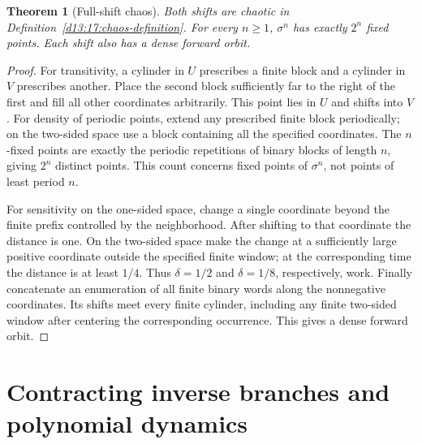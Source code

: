 \documentclass[11pt,oneside]{book}
\newtheorem{theorem}{Theorem}[chapter]
\theoremstyle{definition}
\theoremstyle{remark}\newtheorem{remark}[theorem]{Remark}
\begin{document}
\begin{theorem}[Full-shift chaos]\label{d13:17:full-shift-chaos}
Both shifts are chaotic in Definition~\ref{d13:17:chaos-definition}.
For every \(n\geq1\), \(\sigma^n\) has exactly \(2^n\) fixed points.
Each shift also has a dense forward orbit.
\end{theorem}
\begin{proof}
For transitivity, a cylinder in \(U\) prescribes a finite block and a
cylinder in \(V\) prescribes another. Place the second block sufficiently
far to the right of the first and fill all other coordinates arbitrarily.
This point lies in \(U\) and shifts into \(V\).
For density of periodic points, extend any prescribed finite block
periodically; on the two-sided space use a block containing all the
specified coordinates. The \(n\)-fixed points are exactly the
periodic repetitions of binary blocks of length \(n\), giving \(2^n\)
distinct points. This count concerns fixed points of \(\sigma^n\),
not points of least period \(n\).

For sensitivity on the one-sided space, change a single coordinate
beyond the finite prefix controlled by the neighborhood. After shifting
to that coordinate the distance is one. On the two-sided space make
the change at a sufficiently large positive coordinate outside the
specified finite window; at the corresponding time the distance is
at least \(1/4\). Thus \(\delta=1/2\) and \(\delta=1/8\), respectively,
work. Finally concatenate an enumeration of all finite binary words
along the nonnegative coordinates. Its shifts meet every finite
cylinder, including any finite two-sided window after centering the
corresponding occurrence. This gives a dense forward orbit.
\end{proof}

\section{Contracting inverse branches and polynomial dynamics}
\end{document}
